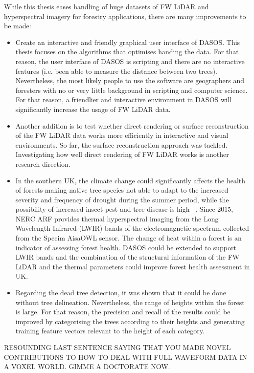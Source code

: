 \documentclass{subfiles}
\begin{document}
{\color{blue}
\par While this thesis eases handling of huge datasets of FW LiDAR and hyperspectral imagery for forestry applications, there are many improvements to be made:
\begin{itemize}
	\item Create an interactive and friendly graphical user interface of DASOS. This thesis focuses on the algorithms that optimises handing the data. For that reason, the user interface of DASOS is scripting and there are no interactive features (i.e. been able to measure the distance between two trees). Nevertheless, the most likely people to use the software are geographers and foresters with no or very little background in scripting and computer science. For that reason, a friendlier and interactive environment in DASOS will significantly increase the usage of FW LiDAR data.  
	\item Another addition is to test whether direct rendering or surface reconstruction of the FW LiDAR data works more efficiently in interactive and visual environments. So far, the surface reconstruction approach was tackled. Investigating how well direct rendering of FW LiDAR works is another research direction. 
	\item In the southern UK, the climate change could significantly affects the health of forests making native tree species not able to adapt to the increased severity and frequency of drought during the summer period, while the possibility of increased insect pest and tree disease is high ~\cite{Read2009}.  Since 2015, NERC ARF provides thermal hyperspectral imaging from the Long Wavelength Infrared (LWIR) bands of the electromagnetic spectrum collected from the Specim AisaOWL sensor. The change of heat within a forest is an indicator of assessing forest health. DASOS could be extended to support LWIR bands and the combination of the structural information of the FW LiDAR and the thermal parameters could improve forest health assessment in UK.  	
	\item Regarding the dead tree detection, it was shown that it could be done without tree delineation. Nevertheless, the range of heights within the forest is large. For that reason, the precision and recall of the results could be improved by categorising the trees according to their heights and generating training feature vectors relevant to the height of each category.  
	
\end{itemize}



\par 


\par 
}
RESOUNDING LAST SENTENCE SAYING THAT YOU MADE NOVEL CONTRIBUTIONS TO HOW TO DEAL WITH FULL WAVEFORM DATA IN A VOXEL WORLD.  GIMME A DOCTORATE NOW.
\end{document}

